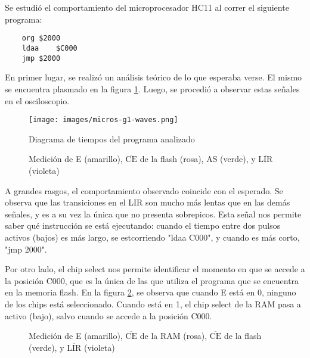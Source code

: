 \documentclass[micros_g1_main.tex]{subfiles}
\begin{document}
\section{}

Se estudi\'o el comportamiento del microprocesador HC11 al correr el siguiente programa:

	\begin{lstlisting}
	org	$2000
	ldaa	$C000
	jmp	$2000
	\end{lstlisting}

En primer lugar, se realiz\'o un an\'alisis te\'orico de lo que esperaba verse. El mismo se encuentra plasmado en la figura \ref{fig:teorico}. Luego, se procedi\'o a observar estas se\~nales en el osciloscopio.

\begin{figure}[ht]
	\centering
	\texttt{[image: images/micros-g1-waves.png]}
	\caption{Diagrama de tiempos del programa analizado}
	\label{fig:teorico}
\end{figure}

\begin{figure}[ht]
	\centering
	\caption{Medici\'on de E (amarillo), $\overline{\text{CE}}$ de la flash (rosa), AS (verde), y $\overline{\text{LIR}}$ (violeta)}
\end{figure}


A grandes rasgos, el comportamiento observado coincide con el esperado. Se observa que las transiciones en el LIR son mucho m\'as lentas que en las dem\'as se\~nales, y es a su vez la \'unica que no presenta sobrepicos. Esta se\~nal nos permite saber qu\'e instrucci\'on se est\'a ejecutando: cuando el tiempo entre dos pulsos activos (bajos) es m\'as largo, se est\a corriendo "ldaa C000", y cuando es m\'as corto, "jmp 2000". 

Por otro lado, el chip select nos permite identificar el momento en que se accede a la posici\'on C000, que es la \'unica de las que utiliza el programa que se encuentra en la memoria flash. En la figura \ref{fig:chip-enable}, se observa que cuando E est\'a en 0, ninguno de los chips est\'a seleccionado. Cuando est\'a en 1, el chip select de la RAM pasa a activo (bajo), salvo cuando se accede a la posici\'on C000.

\begin{figure}[ht]
	\centering
	\caption{Medici\'on de E (amarillo), $\overline{\text{CE}}$ de la RAM (rosa), $\overline{\text{CE}}$ de la flash (verde), y $\overline{\text{LIR}}$ (violeta)}
	\label{fig:chip-enable}
\end{figure}
\end{document}
